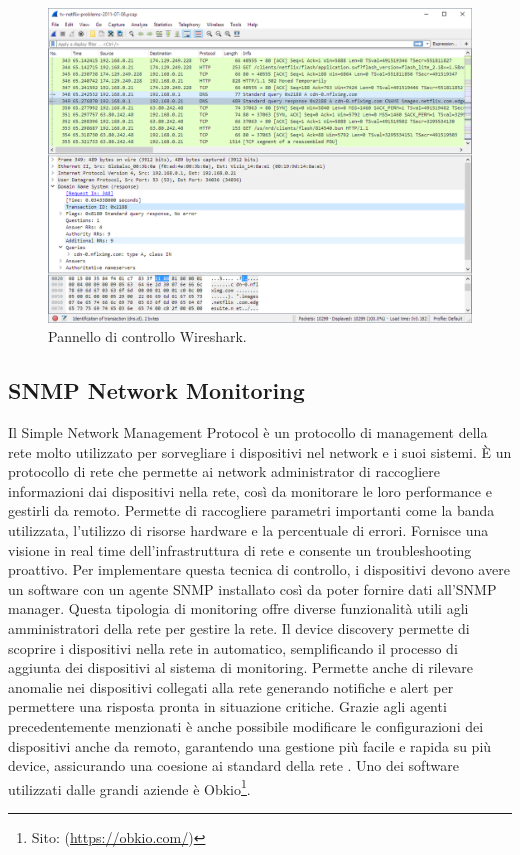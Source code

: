         \begin{figure}[H]
            \centering
            \includegraphics[width=1.0\textwidth]{Immagini/wireshark_dashboard.png}
            \caption{Pannello di controllo Wireshark.}
            \label{fig:wireshark_dashboard}
        \end{figure}

    \subsection{SNMP Network Monitoring}
        Il Simple Network Management Protocol è un protocollo di management della rete molto utilizzato per sorvegliare i dispositivi nel network e i suoi sistemi. È un protocollo di rete che permette ai network administrator di raccogliere informazioni dai dispositivi nella rete, così da monitorare le loro performance e gestirli da remoto. Permette di raccogliere parametri importanti come la banda utilizzata, l'utilizzo di risorse hardware e la percentuale di errori. Fornisce una visione in real time dell'infrastruttura di rete e consente un troubleshooting proattivo. Per implementare questa tecnica di controllo, i dispositivi devono avere un software con un agente SNMP installato così da poter fornire dati all'SNMP manager. Questa tipologia di monitoring offre diverse funzionalità utili agli amministratori della rete per gestire la rete. Il device discovery permette di scoprire i dispositivi nella rete in automatico, semplificando il processo di aggiunta dei dispositivi al sistema di monitoring. Permette anche di rilevare anomalie nei dispositivi collegati alla rete generando notifiche e alert per permettere una risposta pronta in situazione critiche. Grazie agli agenti precedentemente menzionati è anche possibile modificare le configurazioni dei dispositivi anche da remoto, garantendo una gestione più facile e rapida su più device, assicurando una coesione ai standard della rete \cite{obkio_net_monitors}. Uno dei software utilizzati dalle grandi aziende è Obkio\footnote{\label{obkio_site}Sito: (\url{https://obkio.com/})}.

